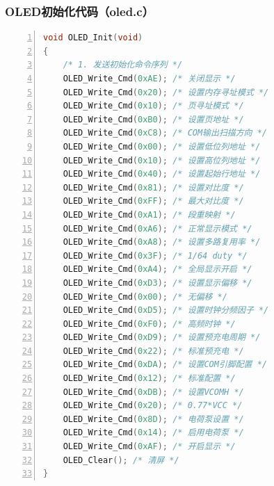 \subsubsection{OLED初始化代码（oled.c）}
\begin{lstlisting}[language=C, basicstyle=\ttfamily\footnotesize, numbers=left, numberstyle=\tiny, stepnumber=1, numbersep=5pt, frame=shadowbox, rulesepcolor=\color{red!20!green!20!blue!20}, keywordstyle=\color{blue}\bfseries, commentstyle=\color{codegreen}, stringstyle=\color{orange}, showstringspaces=false]
void OLED_Init(void)
{
    /* 1. 发送初始化命令序列 */
    OLED_Write_Cmd(0xAE); /* 关闭显示 */
    OLED_Write_Cmd(0x20); /* 设置内存寻址模式 */
    OLED_Write_Cmd(0x10); /* 页寻址模式 */
    OLED_Write_Cmd(0xB0); /* 设置页地址 */
    OLED_Write_Cmd(0xC8); /* COM输出扫描方向 */
    OLED_Write_Cmd(0x00); /* 设置低位列地址 */
    OLED_Write_Cmd(0x10); /* 设置高位列地址 */
    OLED_Write_Cmd(0x40); /* 设置起始行地址 */
    OLED_Write_Cmd(0x81); /* 设置对比度 */
    OLED_Write_Cmd(0xFF); /* 最大对比度 */
    OLED_Write_Cmd(0xA1); /* 段重映射 */
    OLED_Write_Cmd(0xA6); /* 正常显示模式 */
    OLED_Write_Cmd(0xA8); /* 设置多路复用率 */
    OLED_Write_Cmd(0x3F); /* 1/64 duty */
    OLED_Write_Cmd(0xA4); /* 全局显示开启 */
    OLED_Write_Cmd(0xD3); /* 设置显示偏移 */
    OLED_Write_Cmd(0x00); /* 无偏移 */
    OLED_Write_Cmd(0xD5); /* 设置时钟分频因子 */
    OLED_Write_Cmd(0xF0); /* 高频时钟 */
    OLED_Write_Cmd(0xD9); /* 设置预充电周期 */
    OLED_Write_Cmd(0x22); /* 标准预充电 */
    OLED_Write_Cmd(0xDA); /* 设置COM引脚配置 */
    OLED_Write_Cmd(0x12); /* 标准配置 */
    OLED_Write_Cmd(0xDB); /* 设置VCOMH */
    OLED_Write_Cmd(0x20); /* 0.77*VCC */
    OLED_Write_Cmd(0x8D); /* 电荷泵设置 */
    OLED_Write_Cmd(0x14); /* 启用电荷泵 */
    OLED_Write_Cmd(0xAF); /* 开启显示 */
    OLED_Clear(); /* 清屏 */
}
\end{lstlisting}


